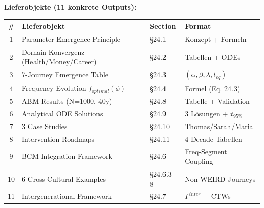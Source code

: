 \begin{tcolorbox}[colback=purple!5!white, colframe=purple!75!black, title=Chapter Scope: Ziel / In-Scope / Out-of-Scope / Lieferobjekte]
\vspace{0.3cm}
\textbf{Lieferobjekte (11 konkrete Outputs):}

\begin{center}
\small
\renewcommand{\arraystretch}{1.1}
\begin{tabular}{@{}clll@{}}
\toprule
\textbf{\#} & \textbf{Lieferobjekt} & \textbf{Section} & \textbf{Format} \\
\midrule
1 & Parameter-Emergence Principle & \S24.1 & Konzept + Formeln \\
2 & Domain Konvergenz (Health/Money/Career) & \S24.2 & Tabellen + ODEs \\
3 & 7-Journey Emergence Table & \S24.3 & $(\alpha, \beta, \lambda, t_{eq})$ \\
4 & Frequency Evolution $f_{optimal}(\phi)$ & \S24.4 & Formel (Eq. 24.3) \\
5 & ABM Results (N=1000, 40y) & \S24.8 & Tabelle + Validation \\
6 & Analytical ODE Solutions & \S24.9 & 3 Lösungen + $t_{95\%}$ \\
7 & 3 Case Studies & \S24.10 & Thomas/Sarah/Maria \\
8 & Intervention Roadmaps & \S24.11 & 4 Decade-Tabellen \\
9 & BCM Integration Framework & \S24.6 & Freq-Segment Coupling \\
10 & 6 Cross-Cultural Examples & \S24.6.3--8 & Non-WEIRD Journeys \\
11 & Intergenerational Framework & \S24.7 & $\Gamma^{inter}$ + CTWs \\
\bottomrule
\end{tabular}
\end{center}

\end{tcolorbox}



